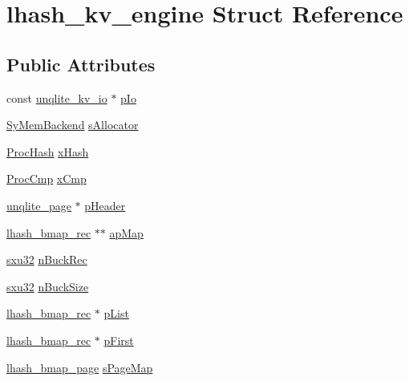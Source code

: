 \hypertarget{structlhash__kv__engine}{\section{lhash\-\_\-kv\-\_\-engine Struct Reference}
\label{d8/d58/structlhash__kv__engine}
}
\subsection*{Public Attributes}
\begin{DoxyCompactItemize}
\item 
const \hyperlink{structunqlite__kv__io}{unqlite\-\_\-kv\-\_\-io} $\ast$ \hyperlink{structlhash__kv__engine_a4eef3dbe886a6d708439ffbfb0a4b6bb}{p\-Io}
\item 
\hyperlink{struct_sy_mem_backend}{Sy\-Mem\-Backend} \hyperlink{structlhash__kv__engine_af7188c4630ad4d95100a3f828a0f7eef}{s\-Allocator}
\item 
\hyperlink{unqlite_8c_a38d523bbe0ae0e849597c37b22bfe806}{Proc\-Hash} \hyperlink{structlhash__kv__engine_a5df0b510750d1928071b1c42eaaed6ec}{x\-Hash}
\item 
\hyperlink{unqlite_8c_a60d84ee80a4995e96155889025d0603c}{Proc\-Cmp} \hyperlink{structlhash__kv__engine_af54b44cf922d2a7a0e533bb6280847df}{x\-Cmp}
\item 
\hyperlink{structunqlite__page}{unqlite\-\_\-page} $\ast$ \hyperlink{structlhash__kv__engine_a8f846e46d592c3a4d7a0a74f091a2511}{p\-Header}
\item 
\hyperlink{structlhash__bmap__rec}{lhash\-\_\-bmap\-\_\-rec} $\ast$$\ast$ \hyperlink{structlhash__kv__engine_a091846f42639ba4656ae50c370bdbd7b}{ap\-Map}
\item 
\hyperlink{unqlite_8c_abc5a8a3f345c200c98c485551f49666e}{sxu32} \hyperlink{structlhash__kv__engine_af0d5db15d4f6add429c3593c4fb86a56}{n\-Buck\-Rec}
\item 
\hyperlink{unqlite_8c_abc5a8a3f345c200c98c485551f49666e}{sxu32} \hyperlink{structlhash__kv__engine_a688262b94eb2cfa3f0e78cd9e265f79c}{n\-Buck\-Size}
\item 
\hyperlink{structlhash__bmap__rec}{lhash\-\_\-bmap\-\_\-rec} $\ast$ \hyperlink{structlhash__kv__engine_a7906cbfc276a35234d418e308ac6dd91}{p\-List}
\item 
\hyperlink{structlhash__bmap__rec}{lhash\-\_\-bmap\-\_\-rec} $\ast$ \hyperlink{structlhash__kv__engine_a9804f7b95b0796c48b28e8b1ecd19fe9}{p\-First}
\item 
\hyperlink{structlhash__bmap__page}{lhash\-\_\-bmap\-\_\-page} \hyperlink{structlhash__kv__engine_a0f67242ccdd41427f851daafc316418f}{s\-Page\-Map}
$$
\end{DoxyCompactItemize}
